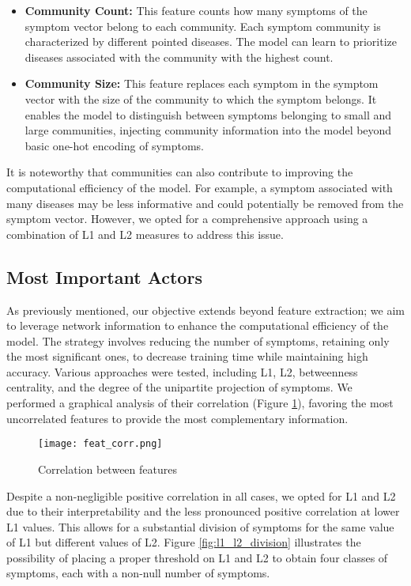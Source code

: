 \begin{itemize}
    \setlength\itemsep{1em} %

    \item \textbf{Community Count:} This feature counts how many symptoms of the symptom vector belong to each community.
          Each symptom community is characterized by different pointed diseases. The model can learn to prioritize
          diseases associated with the community with the highest count.

    \item \textbf{Community Size:} This feature replaces each symptom in the symptom vector with the size of the
          community to which the symptom belongs. It enables the model to distinguish between symptoms belonging to small and
          large communities, injecting community information into the model beyond basic one-hot encoding of symptoms.
\end{itemize}
\noindent
\vspace{0.4cm}
It is noteworthy that communities can also contribute to improving the computational efficiency of the model.
For example, a symptom associated with many diseases may be less informative and could potentially be removed from the
symptom vector. However, we opted for a comprehensive approach using a combination of L1 and L2 measures to address this issue.


\subsection{Most Important Actors}

As previously mentioned, our objective extends beyond feature extraction; we aim to leverage network information to
enhance the computational efficiency of the model. The strategy involves reducing the number of symptoms,
retaining only the most significant ones, to decrease training time while maintaining high accuracy.
Various approaches were tested, including L1, L2, betweenness centrality, and the degree of the unipartite projection
of symptoms. We performed a graphical analysis of their correlation (Figure \ref{fig:feat_corr}), favoring the
most uncorrelated features to provide the most complementary information.

\begin{figure}[H]
    \centering
    \texttt{[image: feat\_corr.png]}
    \caption{Correlation between features}
    \label{fig:feat_corr}
\end{figure}
\noindent
Despite a non-negligible positive correlation in all cases, we opted for L1 and L2 due to their interpretability and
the less pronounced positive correlation at lower L1 values. This allows for a substantial division of symptoms for
the same value of L1 but different values of L2. Figure \ref{fig:l1_l2_division} illustrates the possibility of
placing a proper threshold on L1 and L2 to obtain four classes of symptoms, each with a non-null number of symptoms.


